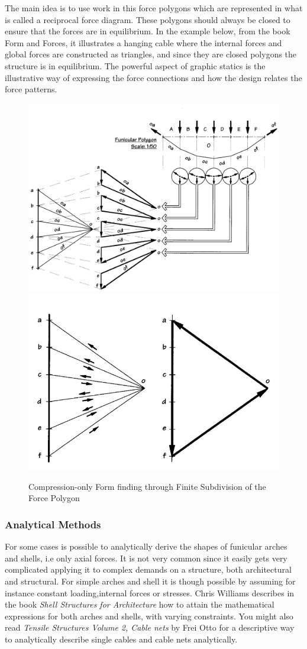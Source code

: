 The main idea is to use work in this force polygons which are represented in what is called a reciprocal force diagram. These polygons should always be closed to ensure that the forces are in equilibrium. In the example below, from the book Form and Forces, it illustrates a hanging cable where the internal forces and global forces are constructed as triangles, and since they are closed polygons the structure is in equilibrium. The powerful aspect of graphic statics is the illustrative way of expressing the force connections and how the design relates the force patterns.   


\begin{figure}[H]
\centering
\includegraphics[width=0.6\linewidth ]{figure/Introduction/GraphStat2.JPG}
\includegraphics[width=0.35\linewidth ]{figure/Introduction/GraphStat3.JPG}
\caption{Compression-only Form finding through Finite Subdivision of the
Force Polygon }
\end{figure}


\subsubsection{Analytical Methods}

For some cases is possible to analytically derive the shapes of funicular arches and shells, i.e only axial forces. It is not very common since it easily gets very complicated applying it to complex demands on a structure, both architectural and structural. For simple arches and shell it is though possible by assuming for instance constant loading,internal forces or stresses.  Chris Williams describes in the book \textit{Shell Structures for Architecture} how to attain the mathematical expressions for both arches and shells, with varying constraints.
You might also read \textit{ Tensile Structures Volume 2,  Cable nets} by Frei Otto for a descriptive way to analytically describe single cables and cable nets analytically. 

